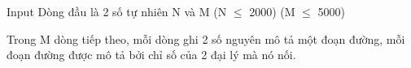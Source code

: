 Input
Dòng đầu là 2 số tự nhiên N và M (N $\le$ 2000) (M $\le$ 5000)

Trong M dòng tiếp theo, mỗi dòng ghi 2 số nguyên mô tả một đoạn đường, mỗi đoạn đường được mô tả bởi chỉ số của 2 đại lý mà nó nối.